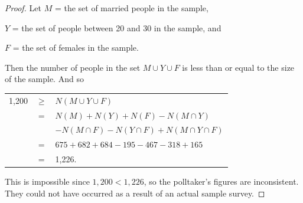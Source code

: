 \documentclass[14pt]{extarticle}
\begin{document}
\begin{proof}
     Let \(M\) = the set of married people in the sample,

     \(Y\) = the set of people between 20 and 30 in the sample, and

     \(F\) = the set of females in the sample.

     Then the number of people in the set \(M \cup Y \cup F\) is less than or equal to the size of the sample. And so

     \begin{tabular}{rcl}
          1,200 & \(\geq\) & \(N(M \cup Y \cup F)\)                             \\
                & =        & \(N(M) + N(Y) + N(F) - N(M \cap Y)\)               \\
                &          & \(-N(M \cap F) -N(Y \cap F) + N(M \cap Y \cap F)\) \\
                & =        & \(675 + 682 + 684 - 195 - 467 - 318 + 165\)        \\
                & =        & 1,226.
     \end{tabular}

     This is impossible since \(1,200 < 1,226\), so the polltaker’s figures are inconsistent. They could not have
     occurred as a result of an actual sample survey.
\end{proof}
\end{document}
